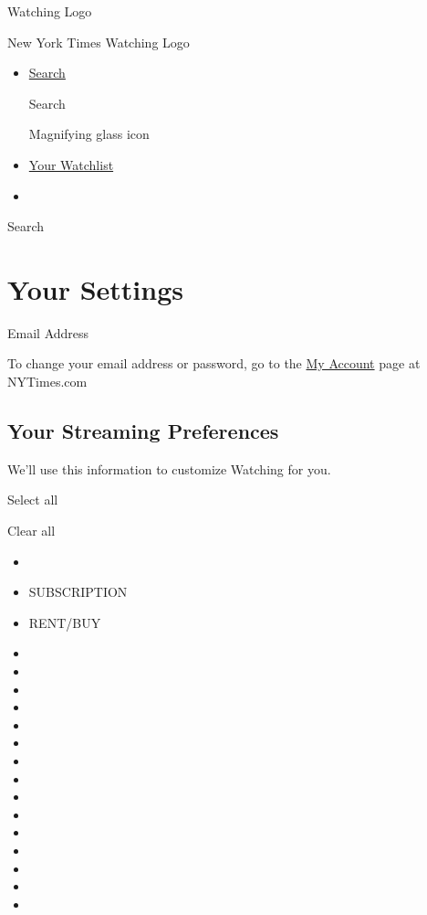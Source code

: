 \href{/watching}{}

Watching Logo

New York Times Watching Logo

\begin{itemize}
\item
  \href{/watching/search}{Search}

  Search

  Magnifying glass icon
\item
  \href{/watching/watchlist}{Your Watchlist}
\item
\end{itemize}

Search

\hypertarget{your-settings}{%
\section{Your Settings}\label{your-settings}}

Email Address

To change your email address or password, go to the
\href{https://myaccount.nytimes.com}{My Account} page at NYTimes.com

\hypertarget{your-streaming-preferences}{%
\subsection{Your Streaming
Preferences}\label{your-streaming-preferences}}

We'll use this information to customize Watching for you.

Select all

\textbar{}

Clear all

\begin{itemize}
\item
\item
  SUBSCRIPTION
\item
  RENT/BUY
\item
\item
\item
\item
\item
\item
\item
\item
\item
\item
\item
\item
\item
\item
\item
\end{itemize}

